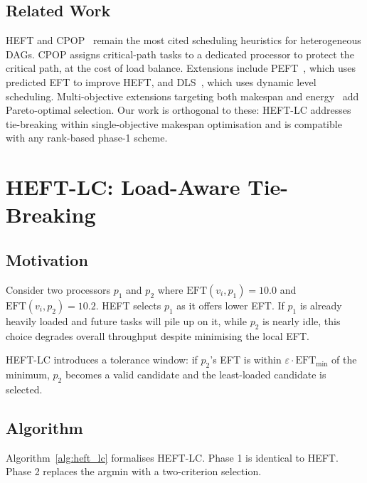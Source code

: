\documentclass[conference]{IEEEtran}
\begin{document}
\subsection{Related Work}

HEFT and CPOP~\cite{topcuoglu2002} remain the most cited scheduling
heuristics for heterogeneous DAGs. CPOP assigns critical-path tasks to a
dedicated processor to protect the critical path, at the cost of load
balance. Extensions include PEFT~\cite{arabnejad2014}, which uses
predicted EFT to improve HEFT, and DLS~\cite{sih1993}, which uses dynamic
level scheduling. Multi-objective extensions targeting both makespan and
energy~\cite{wu2010} add Pareto-optimal selection. Our work is orthogonal
to these: HEFT-LC addresses tie-breaking within single-objective makespan
optimisation and is compatible with any rank-based phase-1 scheme.

\section{HEFT-LC: Load-Aware Tie-Breaking}

\subsection{Motivation}

Consider two processors $p_1$ and $p_2$ where
$\text{EFT}(v_i, p_1) = 10.0$ and $\text{EFT}(v_i, p_2) = 10.2$.
HEFT selects $p_1$ as it offers lower EFT. If $p_1$ is already heavily
loaded and future tasks will pile up on it, while $p_2$ is nearly idle,
this choice degrades overall throughput despite minimising the local EFT.

HEFT-LC introduces a tolerance window: if $p_2$'s EFT is within
$\varepsilon \cdot \text{EFT}_{\min}$ of the minimum, $p_2$ becomes a
valid candidate and the least-loaded candidate is selected.

\subsection{Algorithm}

Algorithm~\ref{alg:heft_lc} formalises HEFT-LC. Phase 1 is identical to
HEFT. Phase 2 replaces the argmin with a two-criterion selection.
\end{document}
